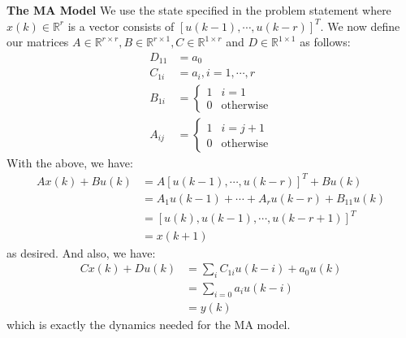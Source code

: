 \documentclass[12pt]{exam}
\begin{document}
\begin{questions}
\begin{solution}
\textbf{The MA Model}
We use the state specified in the problem statement where $x(k) \in \mathbb{R}^r$ is a vector consists of $[u(k-1),\cdots, u(k-r)]^T$. We now define our matrices $A \in \mathbb{R}^{r \times r}, B \in \mathbb{R}^{r \times 1}, C \in \mathbb{R}^{1 \times r}$ and $D \in \mathbb{R}^{1 \times 1}$ as follows:
\begin{align*}
  D_{11} &= a_0 \\
  C_{1i} &= a_i, i = 1, \cdots, r \\
  B_{1i} &=
    \begin{cases}
      1 & i = 1 \\
      0 & \text{otherwise}
    \end{cases} \\
  A_{ij} &= 
    \begin{cases}
      1 & i = j + 1 \\
      0 & \text{otherwise}
    \end{cases} 
\end{align*}
With the above, we have:
\begin{align*}
  Ax(k) + Bu(k) &= A[u(k-1), \cdots, u(k-r)]^T + Bu(k) \\
  &= A_1u(k-1) + \cdots + A_r u(k - r) + B_{11}u(k) \tag{Definition of matrix multiplication} \\
  &= [u(k), u(k-1), \cdots, u(k-r + 1)]^T \tag{$A$ shifts the input down to make space for latest signal from $B$} \\
  &= x(k + 1)
\end{align*}
as desired. And also, we have:
\begin{align*}
  Cx(k) + Du(k) &= \sum_{i} C_{1i} u(k-i) + a_0u(k) \tag{Definition of matrix multiplication} \\
  &= \sum_{i=0} a_i u(k - i) \\
  &= y(k)
\end{align*}
which is exactly the dynamics needed for the MA model.


\end{solution}
\end{questions}
\end{document}
